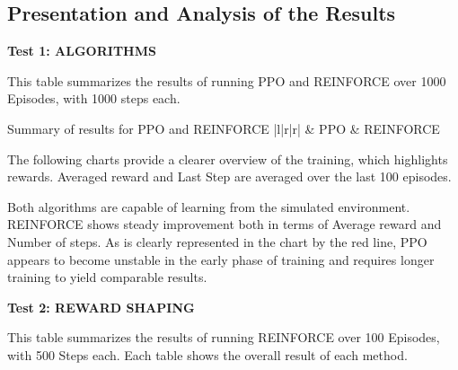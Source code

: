 \subsection{Presentation and Analysis of the Results}
\begin{textblock}

{\bf Test 1: ALGORITHMS }

This table summarizes the results of running PPO and REINFORCE over 1000 Episodes, with 1000 steps each. 
\end{textblock}

    {Summary of results for PPO and REINFORCE}
    {|l|r|r|}{
     & PPO & REINFORCE \\
}

\begin{textblock}
The following charts provide a clearer overview of the training, which highlights rewards. Averaged reward and Last Step are averaged over the last 100 episodes.
\end{textblock}

\newpage



\begin{textblock}
Both algorithms are capable of learning from the simulated environment. REINFORCE shows steady improvement both in terms of Average reward and Number of steps.
As is clearly represented in the chart by the red line, PPO appears to become unstable in the early phase of training and requires longer training to yield comparable results.
\end{textblock}

\newpage
\begin{textblock}
{\bf Test 2: REWARD SHAPING }

This table summarizes the results of running  REINFORCE over 100 Episodes, with 500 Steps each. Each table shows the overall result of each method.
\end{textblock}

